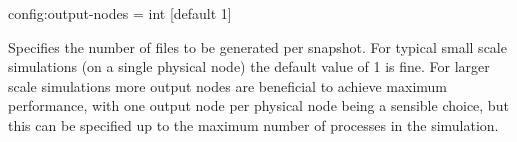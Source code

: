 {\zicf config:output-nodes = int [default 1]} Specifies the number of files to be generated per snapshot. For typical small scale simulations (on a single physical node) the default value of 1 is fine. For larger scale simulations more output nodes are beneficial to achieve maximum performance, with one output node per physical node being a sensible choice, but
this can be specified up to the maximum number of processes in the simulation.



